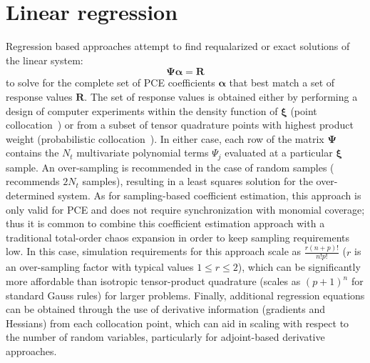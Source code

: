 \section{Linear regression} \label{uq:expansion:regress}

Regression based approaches attempt to find requalarized or exact solutions of the linear
system:
\begin{equation}
\boldsymbol{\Psi} \boldsymbol{\alpha} = \boldsymbol{R} \label{eq:regression}
\end{equation}
to solve for the complete set of PCE coefficients
$\boldsymbol{\alpha}$ that best match a set of response values
$\boldsymbol{R}$.  The set of response values is obtained either by
performing a design of computer experiments within the density
function of $\boldsymbol{\xi}$ (point
collocation~\cite{pt_colloc1,pt_colloc2}) or from a subset of tensor
quadrature points with highest product weight (probabilistic
collocation~\cite{Tat95}).  In either case, each row of the matrix
$\boldsymbol{\Psi}$ contains the $N_t$ multivariate polynomial terms
$\Psi_j$ evaluated at a particular $\boldsymbol{\xi}$ sample.  An
over-sampling is recommended in the case of random samples
(\cite{pt_colloc2} recommends $2N_t$ samples), resulting in a least
squares solution for the over-determined system.  As for
sampling-based coefficient estimation, this approach is only valid for
PCE and does not require synchronization with monomial coverage; thus
it is common to combine this coefficient estimation approach with a
traditional total-order chaos expansion in order to keep sampling
requirements low.  In this case, simulation requirements for this
approach scale as $\frac{r(n+p)!}{n!p!}$ ($r$ is an over-sampling
factor with typical values $1 \leq r \leq 2$), which can be
significantly more affordable than isotropic tensor-product quadrature
(scales as $(p+1)^n$ for standard Gauss rules) for larger problems.
Finally, additional regression equations can be obtained through the
use of derivative information (gradients and Hessians) from each
collocation point, which can aid in scaling with respect to the number
of random variables, particularly for adjoint-based derivative
approaches.

